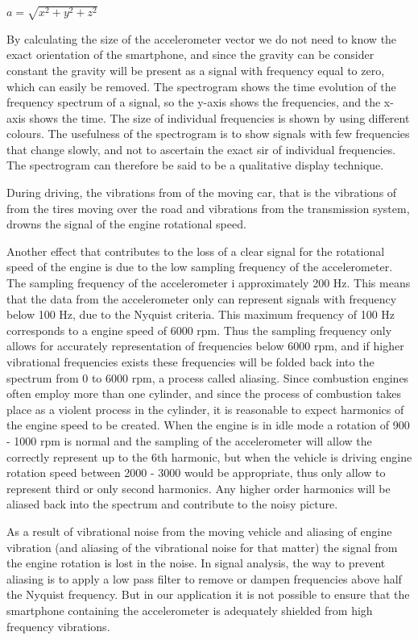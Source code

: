 \begin{center}
$a = \sqrt{x^2+y^2+z^2}$
\end{center}

By calculating the size of the accelerometer vector we do not need to know the exact orientation of the smartphone, and since the gravity can be consider constant the gravity will be present as a signal with frequency equal to zero, which can easily be removed.
The spectrogram shows the time evolution of the frequency spectrum of a signal, so the y-axis shows the frequencies, and the x-axis shows the time. The size of individual frequencies is shown by using different colours. The usefulness of the spectrogram is to show signals with few  frequencies that change slowly, and not to ascertain the exact sir of individual frequencies. The spectrogram can therefore be said to be a qualitative display technique.

During driving, the vibrations from of the moving car, that is the vibrations of from the tires moving over the road and vibrations from the transmission system, drowns the signal of the engine rotational speed.

Another effect that contributes to the loss of a clear signal for the rotational speed of the engine is due to the low sampling frequency of the accelerometer. The sampling frequency of the accelerometer i approximately 200 Hz. This means that the data from the accelerometer only can represent signals with frequency below 100 Hz, due to the Nyquist criteria. This maximum frequency of 100 Hz corresponds to a engine speed of 6000 rpm. Thus the sampling frequency only allows for accurately representation of frequencies below 6000 rpm, and if higher vibrational frequencies exists these frequencies will be folded back into the spectrum from 0 to 6000 rpm, a process called aliasing. Since combustion engines often employ more than one cylinder, and since the process of combustion takes place as a violent process in the cylinder, it is reasonable to expect harmonics of the engine speed to be created. When the engine is in idle mode a rotation of 900 - 1000 rpm is normal and the sampling of the accelerometer will allow the correctly represent up to the 6th harmonic, but when the vehicle is driving engine rotation speed between  
2000 - 3000 would be appropriate, thus only allow to represent third or only second harmonics. Any higher order harmonics will be aliased back into the spectrum and contribute to the noisy picture. 

As a result of vibrational noise from the moving vehicle and aliasing of engine vibration (and aliasing of the vibrational noise for that matter) the signal from the engine rotation is lost in the noise. In signal analysis, the way to prevent aliasing is to apply a low pass filter to remove or dampen frequencies above half the Nyquist frequency. But in our application it is not possible to ensure that the smartphone containing the accelerometer is adequately shielded from high frequency vibrations.

